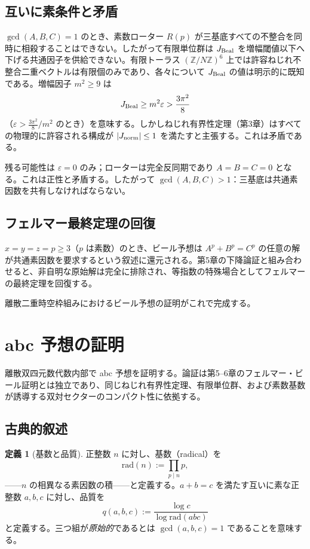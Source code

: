 \documentclass[dvipdfmx,a4paper]{article}
\theoremstyle{definition}
\newtheorem{definition}[theorem]{定義}
\theoremstyle{remark}
\newcommand{\Jnorm}{J_{\rm norm}}
\newcommand{\Jbound}{\frac{3\pi^2}{8}}
\begin{document}
\subsection{互いに素条件と矛盾}

$\gcd(A,B,C) = 1$ のとき、素数ローター $R(p)$ が三基底すべての不整合を同時に相殺することはできない。したがって有限単位群は $J_{\rm Beal}$ を増幅閾値以下へ下げる共通因子を供給できない。有限トーラス $(\mathbb{Z}/N\mathbb{Z})^6$ 上では許容ねじれ不整合二重ベクトルは有限個のみであり、各々について $J_{\rm Beal}$ の値は明示的に既知である。増幅因子 $m^2 \geq 9$ は
\[
J_{\rm Beal} \geq m^2 \varepsilon > \Jbound
\]
（$\varepsilon > \Jbound/m^2$ のとき）を意味する。しかしねじれ有界性定理（第3章）はすべての物理的に許容される構成が $|\Jnorm| \leq 1$ を満たすと主張する。これは矛盾である。

残る可能性は $\varepsilon = 0$ のみ；ローターは完全反同期であり $A = B = C = 0$ となる。これは正性と矛盾する。したがって $\gcd(A,B,C) > 1$：三基底は共通素因数を共有しなければならない。

\subsection{フェルマー最終定理の回復}

$x = y = z = p \geq 3$（$p$ は素数）のとき、ビール予想は $A^p + B^p = C^p$ の任意の解が共通素因数を要求するという叙述に還元される。第5章の下降論証と組み合わせると、非自明な原始解は完全に排除され、等指数の特殊場合としてフェルマーの最終定理を回復する。

離散二重時空枠組みにおけるビール予想の証明がこれで完成する。

\section{abc 予想の証明}

離散双四元数代数内部で abc 予想を証明する。論証は第5--6章のフェルマー・ビール証明とは独立であり、同じねじれ有界性定理、有限単位群、および素数基数が誘導する双対セクターのコンパクト性に依拠する。

\subsection{古典的叙述}

\begin{definition}[基数と品質]
正整数 $n$ に対し、基数（radical）を
\[
\mathrm{rad}(n) := \prod_{p \mid n} p,
\]
——$n$ の相異なる素因数の積——と定義する。$a + b = c$ を満たす互いに素な正整数 $a, b, c$ に対し、品質を
\[
q(a,b,c) := \frac{\log c}{\log \mathrm{rad}(abc)}
\]
と定義する。三つ組が\emph{原始的}であるとは $\gcd(a,b,c) = 1$ であることを意味する。
\end{definition}
\end{document}

